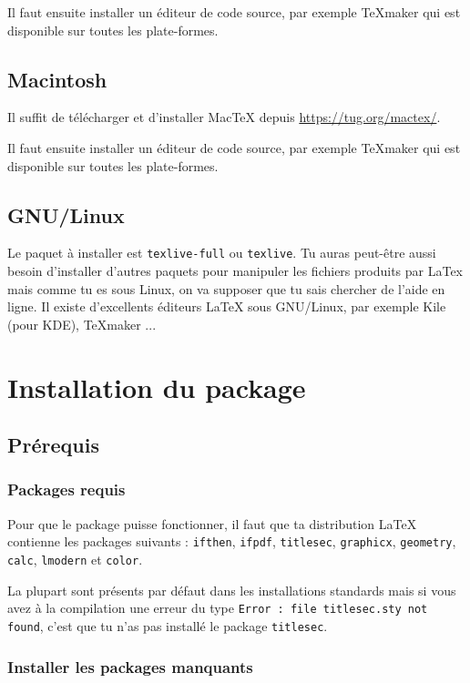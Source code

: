 \documentclass[a4paper,12pt,twoside]{article}
\begin{document}
Il faut ensuite installer un éditeur de code source, par exemple TeXmaker qui est disponible sur toutes les plate-formes.

\subsection{Macintosh}

Il suffit de télécharger et d'installer MacTeX depuis \url{https://tug.org/mactex/}. 

Il faut ensuite installer un éditeur de code source, par exemple TeXmaker qui est disponible sur toutes les plate-formes.

\subsection{GNU/Linux}

Le paquet à installer est \texttt{texlive-full} ou \texttt{texlive}. Tu auras peut-être aussi besoin d'installer d'autres paquets pour manipuler les fichiers produits par LaTex mais comme tu es sous Linux, on va supposer que tu sais chercher de l'aide en ligne. Il existe d'excellents éditeurs LaTeX sous GNU/Linux, par exemple Kile (pour KDE), TeXmaker ...

\section{Installation du package}

\subsection{Prérequis}

\subsubsection{Packages requis}

Pour que le package puisse fonctionner, il faut que ta distribution LaTeX contienne les packages suivants : \texttt{ifthen}, \texttt{ifpdf}, \texttt{titlesec}, \texttt{graphicx}, \texttt{geometry}, \texttt{calc}, \texttt{lmodern} et \texttt{color}.

La plupart sont présents par défaut dans les installations standards mais si vous avez à la compilation une erreur du type \verb|Error : file titlesec.sty not found|, c'est que tu n'as pas installé le package \texttt{titlesec}.

\subsubsection{Installer les packages manquants}
\end{document}
